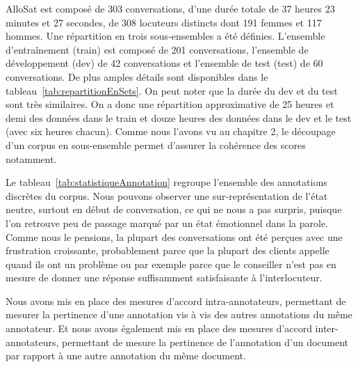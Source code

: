 

AlloSat est composé de 303 conversations, d'une durée totale de 37 heures 23 minutes et 27 secondes, de 308 locuteurs distincts dont 191 femmes et 117 hommes.
Une répartition en trois sous-ensembles a été définies. L'ensemble d’entraînement (train) est composé de 201 conversations, l'ensemble de développement (dev) de 42 conversations et l'ensemble de test (test) de 60 conversations. De plus amples détails sont disponibles dans le tableau~\ref{tab:repartitionEnSets}.
On peut noter que la durée du dev et du test sont très similaires. On a donc une répartition approximative de 25 heures et demi des données dans le train et douze heures des données dans le dev et le test (avec six heures chacun). Comme nous l'avons vu au chapitre 2, le découpage d'un corpus en sous-ensemble permet d'assurer la cohérence des scores notamment.



Le tableau~\ref{tab:statistiqueAnnotation} regroupe l'ensemble des annotations discrètes du corpus. Nous pouvons observer une sur-représentation de l'état neutre, surtout en début de conversation, ce qui ne nous a pas surpris, puisque l'on retrouve peu de passage marqué par un état émotionnel dans la parole. Comme nous le pensions, la plupart des conversations ont été perçues avec une frustration croissante, probablement parce que la plupart des clients appelle quand ils ont un problème ou par exemple parce que le conseiller n’est pas en mesure de donner une réponse suffisamment satisfaisante à l’interlocuteur.

Nous avons mis en place des mesures d'accord intra-annotateurs, permettant de mesurer la pertinence d'une annotation vis à vis des autres annotations du même annotateur. Et nous avons également mis en place des mesures d'accord inter-annotateurs, permettant de mesure la pertinence de l'annotation d'un document par rapport à une autre annotation du même document. %

